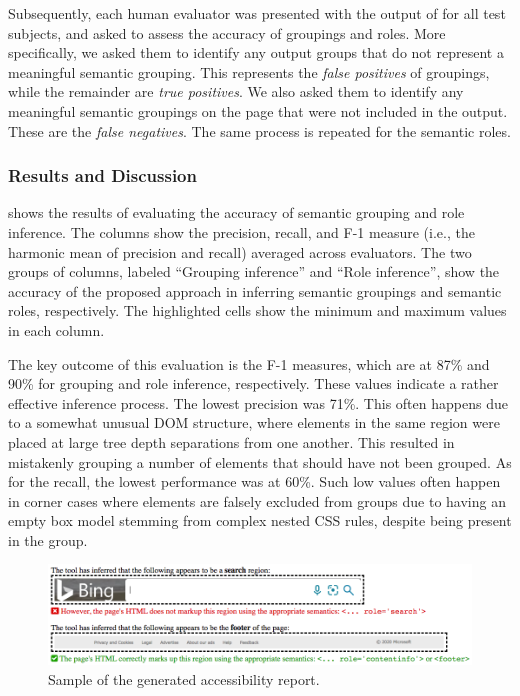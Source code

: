 Subsequently, each human evaluator was presented with the output of \toolname 
for all test subjects, and asked to assess the accuracy of groupings and roles.  
More specifically, we asked them to identify any output groups 
that do not represent a meaningful semantic grouping. This represents 
the \emph{false positives} of groupings, 
while the remainder are \emph{true positives}. 
We also asked them to identify any meaningful semantic groupings on the page 
that were not included in the output. These are the \emph{false negatives}. 
The same process is repeated for the semantic roles.

\subsubsection{Results and Discussion}
 shows the results of evaluating the accuracy 
of semantic grouping and role inference. 
The columns show the precision, recall, and F-1 measure (i.e., the harmonic mean of precision and recall) averaged across evaluators. 
The two groups of columns, labeled ``Grouping inference'' 
and ``Role inference'', 
show the accuracy of the proposed approach in inferring 
semantic groupings and semantic roles, respectively. 
The highlighted cells show the minimum and maximum 
values in each column.

The key outcome of this evaluation is the F-1 measures, 
which are at 87\% and 90\% 
for grouping and role inference, respectively. 
These values indicate a rather effective inference process. 
The lowest precision was 71\%. This often happens due to 
a somewhat unusual DOM structure, where elements in the 
same region were placed at large tree depth separations 
from one another. This resulted in mistakenly grouping a 
number of elements that should have not been grouped.
As for the recall, the lowest performance was at 60\%. 
Such low values often happen in corner cases where 
elements are falsely excluded from groups due to having 
an empty box model stemming from complex nested CSS rules, 
despite being present in the group.  

\begin{figure}%
	\centering
	\includegraphics[scale=0.4]{accessibility_testing/figures/output-sample.png}
	\caption{Sample of the generated accessibility report.}
	\label{fig:output}
\end{figure}


